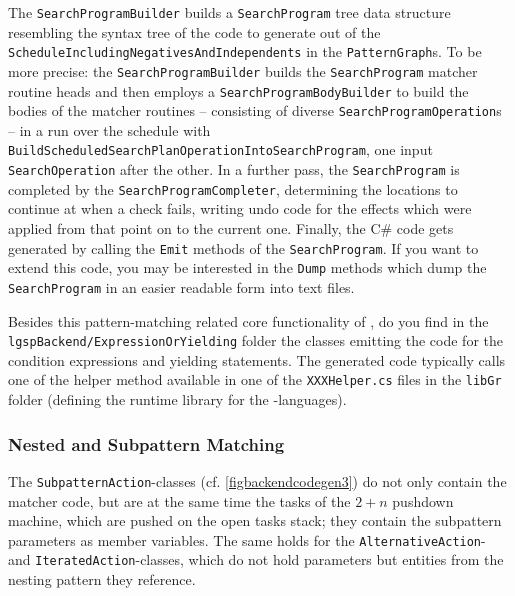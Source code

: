 The \texttt{Search\-Program\-Builder} builds a \texttt{Search\-Program} tree data structure resembling the syntax tree of the code to generate out of the \texttt{Schedule\-Including\-Negatives\-And\-Independents} in the \texttt{Pattern\-Graph}s. 
To be more precise: the \texttt{Search\-Program\-Builder} builds the \texttt{Search\-Program} matcher routine heads and then employs a \texttt{Search\-Program\-Body\-Builder} to build the bodies of the matcher routines -- consisting of diverse \texttt{Search\-Program\-Operation}s -- in a run over the schedule with \texttt{Build\-Scheduled\-Search\-Plan\-Operation\-Into\-Search\-Program}, one input \texttt{Search\-Operation} after the other. 
In a further pass, the \texttt{Search\-Program} is completed by the \texttt{Search\-Program\-Completer},
determining the locations to continue at when a check fails,
writing undo code for the effects which were applied from that point on to the current one.
Finally, the C\# code gets generated by calling the \texttt{Emit} methods of the \texttt{Search\-Program}.
If you want to extend this code, you may be interested in the \texttt{Dump} methods which dump the \texttt{Search\-Program} in an easier readable form into text files.

Besides this pattern-matching related core functionality of \GrG, do you find in the \texttt{lgsp\-Backend/Expression\-Or\-Yielding} folder the classes emitting the code for the condition expressions and yielding statements.
The generated code typically calls one of the helper method available in one of the \texttt{XXXHelper.cs} files in the \texttt{libGr} folder (defining the runtime library for the \GrG-languages).


\subsubsection*{Nested and Subpattern Matching}

The \texttt{Subpattern\-Action}-classes (cf. \ref{figbackendcodegen3}) do not only contain the matcher code, 
but are at the same time the tasks of the $2+n$ pushdown machine, which are pushed on the open tasks stack;
they contain the subpattern parameters as member variables.
The same holds for the \texttt{Alternative\-Action}- and \texttt{Iterated\-Action}-classes,
which do not hold parameters but entities from the nesting pattern they reference. 

